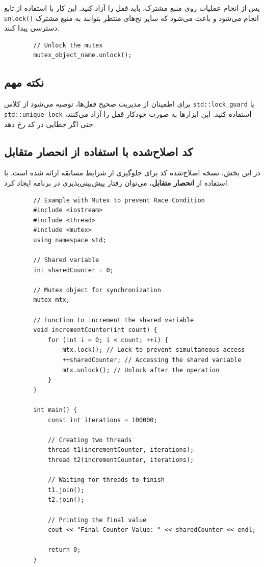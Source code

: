 \documentclass[12pt, a4paper]{report}
\begin{document}
پس از انجام عملیات روی منبع مشترک، باید قفل را آزاد کنید. این کار با استفاده از تابع \texttt{unlock()} انجام می‌شود و باعث می‌شود که سایر نخ‌های منتظر بتوانند به منبع مشترک دسترسی پیدا کنند.

\begin{LTR}
	\begin{lstlisting}
		// Unlock the mutex
		mutex_object_name.unlock();
	\end{lstlisting}
\end{LTR}

\subsection{نکته مهم}

برای اطمینان از مدیریت صحیح قفل‌ها، توصیه می‌شود از کلاس \texttt{std::lock\_guard} یا \texttt{std::unique\_lock} استفاده کنید. این ابزارها به صورت خودکار قفل را آزاد می‌کنند، حتی اگر خطایی در کد رخ دهد.


\subsection{کد اصلاح‌شده با استفاده از انحصار متقابل}

در این بخش، نسخه اصلاح‌شده کد برای جلوگیری از شرایط مسابقه ارائه شده است. با استفاده از \textbf{انحصار متقابل}، می‌توان رفتار پیش‌بینی‌پذیری در برنامه ایجاد کرد.

\begin{LTR}
	\begin{lstlisting}
		// Example with Mutex to prevent Race Condition
		#include <iostream>
		#include <thread>
		#include <mutex>
		using namespace std;
		
		// Shared variable
		int sharedCounter = 0;
		
		// Mutex object for synchronization
		mutex mtx;
		
		// Function to increment the shared variable
		void incrementCounter(int count) {
			for (int i = 0; i < count; ++i) {
				mtx.lock(); // Lock to prevent simultaneous access
				++sharedCounter; // Accessing the shared variable
				mtx.unlock(); // Unlock after the operation
			}
		}
		
		int main() {
			const int iterations = 100000;
			
			// Creating two threads
			thread t1(incrementCounter, iterations);
			thread t2(incrementCounter, iterations);
			
			// Waiting for threads to finish
			t1.join();
			t2.join();
			
			// Printing the final value
			cout << "Final Counter Value: " << sharedCounter << endl;
			
			return 0;
		}
	\end{lstlisting}
\end{LTR}
\end{document}
